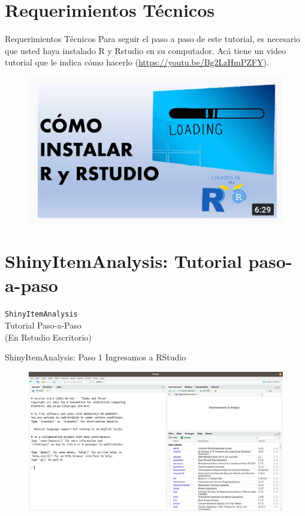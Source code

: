 \documentclass{beamer}
\begin{document}
\section{Requerimientos Técnicos}
\begin{frame}{Requerimientos Técnicos}
Para seguir el paso a paso de este tutorial, es necesario que usted haya instalado R y Rstudio en su computador. Acá tiene un video tutorial que le indica cómo hacerlo (\textcolor{blue}{\url{https://youtu.be/Bg2LzHmPZFY}}).
\begin{figure}
\centering
\includegraphics[width=.7\textwidth]{Chupitos.png}
\end{figure}      
\end{frame}

\section{ShinyItemAnalysis: Tutorial paso-a-paso}
\begin{frame}
\Huge
\centering
\texttt{ShinyItemAnalysis} \\
Tutorial Paso-a-Paso\\
(En Rstudio Escritorio)
\end{frame}


\begin{frame}{ShinyItemAnalysis: Paso 1}
Ingresamos a RStudio 
\begin{figure}
\centering
\includegraphics[width=.95\textwidth]{Apariencia.png}
\end{figure}  
\end{frame}
\end{document}
